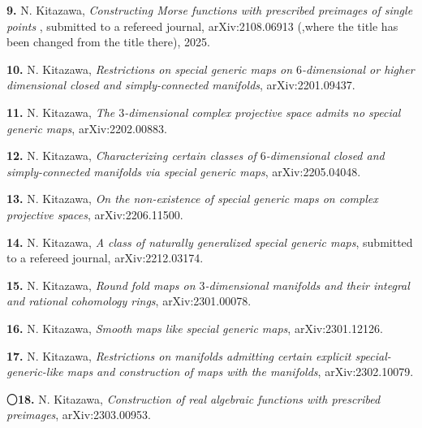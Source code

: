 \documentclass{article}
\begin{document}

\par\noindent
{\bf 9.} N. Kitazawa, \textsl{
Constructing Morse functions with prescribed preimages of single points
}, submitted to a refereed journal, arXiv:2108.06913
(,where the title has been changed from the title there), 2025.

\par\noindent
{\bf 10.} N. Kitazawa, \textsl{Restrictions on special generic maps on $6$-dimensional or higher dimensional closed and simply-connected manifolds}, arXiv:2201.09437.

\par\noindent
{\bf 11.} N. Kitazawa, \textsl{The $3$-dimensional complex projective space admits no special generic maps}, arXiv:2202.00883.

\par\noindent
{\bf 12.} N. Kitazawa, \textsl{Characterizing certain classes of $6$-dimensional closed and simply-connected manifolds via special generic maps}, arXiv:2205.04048.

\par\noindent
{\bf 13.} N. Kitazawa, \textsl{On the non-existence of special generic maps on complex projective spaces}, arXiv:2206.11500.

\par\noindent
{\bf 14.} N. Kitazawa, \textsl{A class of naturally generalized special generic maps}, submitted to a refereed journal, arXiv:2212.03174.

\par\noindent
{\bf 15.} N. Kitazawa, \textsl{Round fold maps on $3$-dimensional manifolds and their integral and rational cohomology rings}, arXiv:2301.00078.

\par\noindent
{\bf 16.} N. Kitazawa, \textsl{Smooth maps like special generic maps}, arXiv:2301.12126.

\par\noindent
{\bf 17.} N. Kitazawa, \textsl{Restrictions on manifolds admitting certain explicit special-generic-like maps and construction of maps with the manifolds}, arXiv:2302.10079.

\par\noindent
〇{\bf 18.} N. Kitazawa, \textsl{Construction of real algebraic functions with prescribed preimages}, arXiv:2303.00953.
\end{document}
